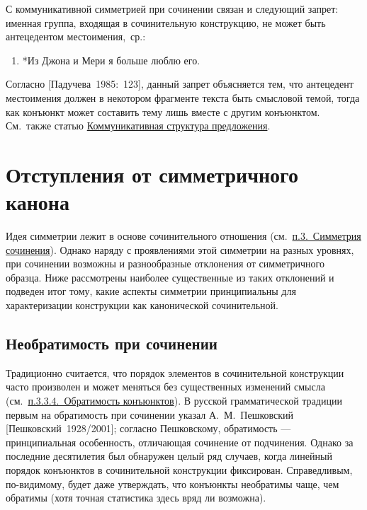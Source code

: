 С коммуникативной симметрией при сочинении связан и следующий запрет:
именная группа, входящая в сочинительную конструкцию, не может быть
антецедентом местоимения,~ср.:

\begin{enumerate}
  \def\labelenumi{(\arabic{enumi})}
  \setcounter{enumi}{24}
  \item
        *Из Джона и Мери я больше люблю его.
\end{enumerate}

Согласно {[}Падучева~1985:~123{]}, данный запрет объясняется тем, что
антецедент местоимения должен в некотором фрагменте текста быть
смысловой темой, тогда как конъюнкт может составить тему лишь вместе с
другим конъюнктом. См.~также статью \underline{Коммуникативная структура
  предложения}.

\section{Отступления от симметричного
  канона}\label{ux43eux442ux441ux442ux443ux43fux43bux435ux43dux438ux44f-ux43eux442-ux441ux438ux43cux43cux435ux442ux440ux438ux447ux43dux43eux433ux43e-ux43aux430ux43dux43eux43dux430}

Идея симметрии лежит в основе сочинительного отношения
(см.~\underline{п.3.~Симметрия сочинения}). Однако наряду с проявлениями
этой симметрии на разных уровнях, при сочинении возможны и разнообразные
отклонения от симметричного образца. Ниже рассмотрены наиболее
существенные из таких отклонений и подведен итог тому, какие аспекты
симметрии принципиальны для характеризации конструкции как канонической
сочинительной.

\subsection{Необратимость при
  сочинении}\label{ux43dux435ux43eux431ux440ux430ux442ux438ux43cux43eux441ux442ux44c-ux43fux440ux438-ux441ux43eux447ux438ux43dux435ux43dux438ux438}

Традиционно считается, что порядок элементов в сочинительной конструкции
часто произволен и может меняться без существенных изменений смысла
(см.~\underline{п.3.3.4.~Обратимость конъюнктов}). В русской
грамматической традиции первым на обратимость при сочинении указал
А.~М.~Пешковский {[}Пешковский~1928/2001{]}; согласно Пешковскому,
обратимость --- принципиальная особенность, отличающая сочинение от
подчинения. Однако за последние десятилетия был обнаружен целый ряд
случаев, когда линейный порядок конъюнктов в сочинительной конструкции
фиксирован. Справедливым, по-видимому, будет даже утверждать, что
конъюнкты необратимы чаще, чем обратимы (хотя точная статистика здесь
вряд ли возможна).

